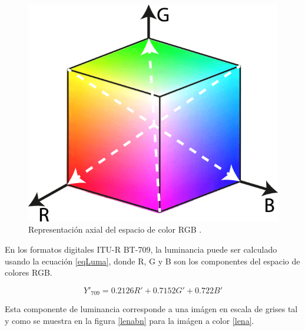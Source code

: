\documentclass[twoside,spanish,ESP,MSc]{plantillaLabUPV}
\theoremstyle{definition}
\begin{document}
\begin{figure}[h] 
	\centering 
		\includegraphics[scale=.35]{ima/rgbcol} 
	\caption{Representación axial del espacio de color RGB \cite{rgbspace}.} 
	\label{rgbcol} 
\end{figure}

En los formatos digitales ITU-R BT-709, la luminancia puede ser calculado usando la ecuación \ref{eqLuma}, donde R, G y B son los componentes del espacio de colores RGB.

\begin{equation}\label{eqLuma}
{\displaystyle Y'_{\text{709}}=0.2126R'+0.7152G'+0.722B'}
\end{equation}

Esta componente de luminancia corresponde a una imágen en escala de grises tal y como se muestra en la figura \ref{lenabn} para la imágen a color \ref{lena}.
\end{document}
